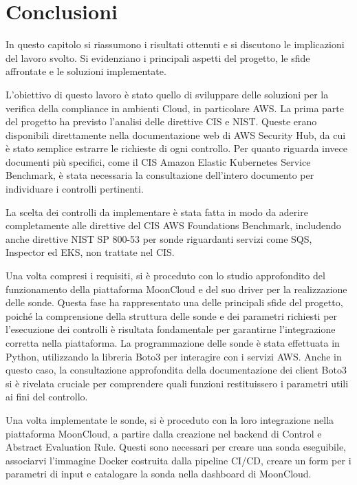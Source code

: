 \chapter{Conclusioni}
\label{cap:conclusioni}

In questo capitolo si riassumono i risultati ottenuti e si discutono le implicazioni del lavoro svolto. Si evidenziano i principali aspetti del progetto, le sfide affrontate e le soluzioni implementate.

L'obiettivo di questo lavoro è stato quello di sviluppare delle soluzioni per la verifica della compliance in ambienti Cloud, in particolare AWS. La prima parte del progetto ha previsto l'analisi delle direttive CIS e NIST. Queste erano disponibili direttamente nella documentazione web di AWS Security Hub, da cui è stato semplice estrarre le richieste di ogni controllo. Per quanto riguarda invece documenti più specifici, come il CIS Amazon Elastic Kubernetes Service Benchmark, è stata necessaria la consultazione dell'intero documento per individuare i controlli pertinenti.

La scelta dei controlli da implementare è stata fatta in modo da aderire completamente alle direttive del CIS AWS Foundations Benchmark, includendo anche direttive NIST SP 800-53 per sonde riguardanti servizi come SQS, Inspector ed EKS, non trattate nel CIS.

Una volta compresi i requisiti, si è proceduto con lo studio approfondito del funzionamento della piattaforma MoonCloud e del suo driver per la realizzazione delle sonde. Questa fase ha rappresentato una delle principali sfide del progetto, poiché la comprensione della struttura delle sonde e dei parametri richiesti per l'esecuzione dei controlli è risultata fondamentale per garantirne l'integrazione corretta nella piattaforma. La programmazione delle sonde è stata effettuata in Python, utilizzando la libreria Boto3 per interagire con i servizi AWS. Anche in questo caso, la consultazione approfondita della documentazione dei client Boto3 si è rivelata cruciale per comprendere quali funzioni restituissero i parametri utili ai fini del controllo.

Una volta implementate le sonde, si è proceduto con la loro integrazione nella piattaforma MoonCloud, a partire dalla creazione nel backend di Control e Abstract Evaluation Rule. Questi sono necessari per creare una sonda eseguibile, associarvi l'immagine Docker costruita dalla pipeline CI/CD, creare un form per i parametri di input e catalogare la sonda nella dashboard di MoonCloud. 

